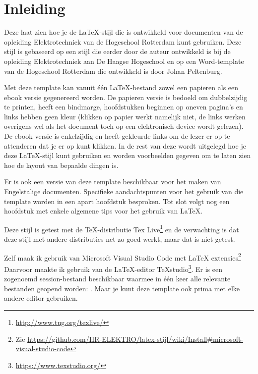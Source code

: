\chapter{Inleiding}
\label{sec:inleiding}
Deze \MakeLowercase\documenttype{} laat zien hoe je de \LaTeX{}-stijl die is ontwikkeld voor documenten van de opleiding Elektrotechniek van de Hogeschool Rotterdam kunt gebruiken.
Deze stijl is gebaseerd op een stijl die eerder door de auteur ontwikkeld is bij de opleiding Elektrotechniek aan De Haagse Hogeschool
en op een Word-template van de Hogeschool Rotterdam die ontwikkeld is door Johan Peltenburg.

Met deze template kan vanuit één \LaTeX{}-bestand zowel een papieren als een ebook versie gegenereerd worden.
De papieren versie is bedoeld om dubbelzijdig te printen, heeft een bindmarge, hoofdstukken beginnen op oneven pagina's en links hebben geen kleur 
(klikken op papier werkt namelijk niet, de links werken overigens wel als het document toch op een elektronisch device wordt gelezen).
De ebook versie is enkelzijdig en heeft gekleurde links om de lezer er op te attenderen dat je er op kunt klikken.
In de rest van deze \MakeLowercase\documenttype{} wordt uitgelegd hoe je deze \LaTeX{}-stijl kunt gebruiken en worden voorbeelden gegeven
om te laten zien hoe de layout van bepaalde dingen is.

Er is ook een versie van deze template beschikbaar voor het maken van Engelstalige documenten.
Specifieke aandachtspunten voor het gebruik van die template worden in een apart hoofdstuk besproken.
Tot slot volgt nog een hoofdstuk met enkele algemene tips voor het gebruik van \LaTeX{}.

Deze stijl is getest met de \TeX{}-distributie Tex Live\footnote{\url{http://www.tug.org/texlive/}} en de verwachting is dat deze stijl met andere distributies net zo goed werkt,
maar dat is niet getest.


Zelf maak ik gebruik van Microsoft Visual Studio Code met LaTeX extensies\footnote{%
    Zie \url{https://github.com/HR-ELEKTRO/latex-stijl/wiki/Install\#microsoft-visual-studio-code}
}
Daarvoor maakte ik gebruik van de \LaTeX{}-editor TeXstudio\footnote{\url{https://www.texstudio.org/}}.
Er is een zogenoemd session\hyp{}bestand beschikbaar waarmee in één keer alle relevante bestanden geopend worden: .
Maar je kunt deze template ook prima met elke andere editor gebruiken.

